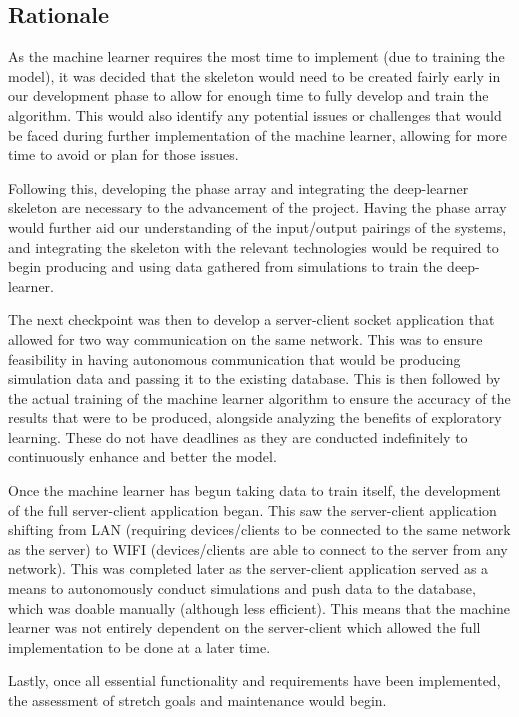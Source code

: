 \documentclass[12pt, titlepage]{article}
\begin{document}
\subsection{Rationale}
As the machine learner requires the most time to implement (due to training the model), it was decided that the skeleton would need to be created fairly early in our development phase to allow for enough time to fully develop and train the algorithm. This would also identify any potential issues or challenges that would be faced during further implementation of the machine learner, allowing for more time to avoid or plan for those issues. 
\par
Following this, developing the phase array and integrating the deep-learner skeleton are necessary to the advancement of the project. Having the phase array would further aid our understanding of the input/output pairings of the systems, and integrating the skeleton with the relevant technologies would be required to begin producing and using data gathered from simulations to train the deep-learner. 
\par
The next checkpoint was then to develop a server-client socket application that allowed for two way communication on the same network. This was to ensure feasibility in having autonomous communication that would be producing simulation data and passing it to the existing database. This is then followed by the actual training of the machine learner algorithm to ensure the accuracy of the results that were to be produced, alongside analyzing the benefits of exploratory learning. These do not have deadlines as they are conducted indefinitely to continuously enhance and better the model.
\par
Once the machine learner has begun taking data to train itself, the development of the full server-client application began. This saw the server-client application shifting from LAN (requiring devices/clients to be connected to the same network as the server) to WIFI (devices/clients are able to connect to the server from any network). This was completed later as the server-client application served as a means to autonomously conduct simulations and push data to the database, which was doable manually (although less efficient). This means that the machine learner was not entirely dependent on the server-client which allowed the full implementation to be done at a later time.
\par
Lastly, once all essential functionality and requirements have been implemented, the assessment of stretch goals and maintenance would begin.
\end{document}
